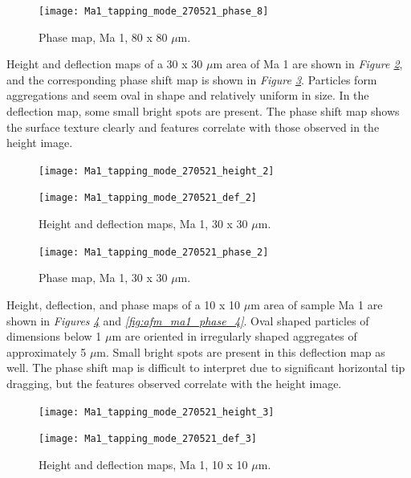 \begin{figure}[H]
\centering
  \texttt{[image: Ma1\_tapping\_mode\_270521\_phase\_8]}
\caption[Phase map, Ma 1]{Phase map, Ma 1, 80 x 80 $\mu$m.}
\label{fig:afm_ma1_phase2}
\end{figure}


Height and deflection maps of a 30 x 30 $\mu$m area of Ma 1 are shown in \textit{Figure \ref{fig:afm_ma1_height_def_3}}, and the corresponding phase shift map is shown in \textit{Figure \ref{fig:afm_ma1_phase_3}}. Particles form aggregations and seem oval in shape and relatively uniform in size. In the deflection map, some small bright spots are present. The phase shift map shows the surface texture clearly and features correlate with those observed in the height image.


\begin{figure}[H]
\centering
\begin{minipage}{.45\textwidth}
  \centering
  \texttt{[image: Ma1\_tapping\_mode\_270521\_height\_2]}
\end{minipage}
\begin{minipage}{.45\textwidth}
  \centering
  \texttt{[image: Ma1\_tapping\_mode\_270521\_def\_2]}
\end{minipage}
\caption[Height and deflection maps, Ma 1]{Height and deflection maps, Ma 1, 30 x 30 $\mu$m.}
\label{fig:afm_ma1_height_def_3}
\end{figure}

\begin{figure}[H]
\centering
  \texttt{[image: Ma1\_tapping\_mode\_270521\_phase\_2]}
\caption[Phase map, Ma 1]{Phase map, Ma 1, 30 x 30 $\mu$m.}
\label{fig:afm_ma1_phase_3}
\end{figure}

Height, deflection, and phase maps of a 10 x 10 $\mu$m area of sample Ma 1 are shown in \textit{Figures \ref{fig:afm_ma1_height_def_4}} and \textit{\ref{fig:afm_ma1_phase_4}}. Oval shaped particles of dimensions below 1 $\mu$m are oriented in irregularly shaped aggregates of approximately 5 $\mu$m. Small bright spots are present in this deflection map as well. The phase shift map is difficult to interpret due to significant horizontal tip dragging, but the features observed correlate with the height image.

\begin{figure}[H]
\centering
\begin{minipage}{.45\textwidth}
  \centering
  \texttt{[image: Ma1\_tapping\_mode\_270521\_height\_3]}
\end{minipage}
\begin{minipage}{.45\textwidth}
  \centering
  \texttt{[image: Ma1\_tapping\_mode\_270521\_def\_3]}
\end{minipage}
\caption[Height and deflection maps, Ma 1]{Height and deflection maps, Ma 1, 10 x 10 $\mu$m.}
\label{fig:afm_ma1_height_def_4}
\end{figure}

